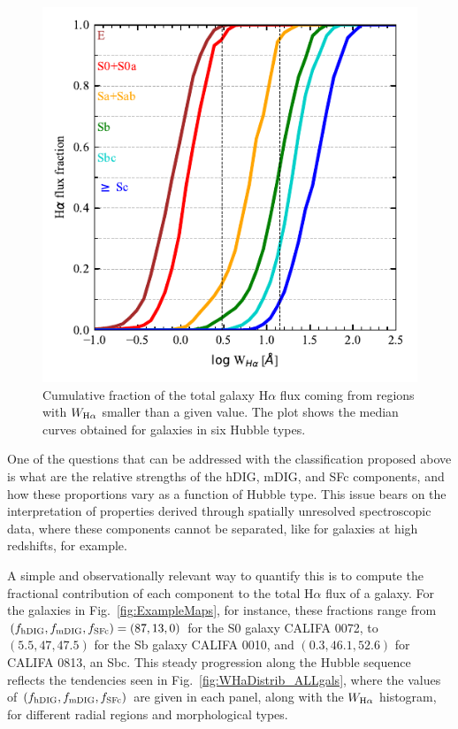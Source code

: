 \documentclass[a4paper, fleqn, usenatbib, useAMS]{mnras}
\newcommand{\Ha}{\ifmmode {\rm H}\alpha \else H$\alpha$\fi\xspace}
\begin{document}
\begin{figure}
 \includegraphics{figs/fig_cumul_fHaWHa_per_morftype.pdf}
 \caption{Cumulative fraction of the total galaxy \Ha flux coming from regions with $W_{\Ha}$ smaller than a given value. The plot shows the median curves obtained for galaxies in six Hubble types.}
 \label{fig:CurveOfGrowth}
\end{figure}

One of the questions that can be addressed with the classification proposed above is what are the relative strengths of the hDIG, mDIG, and SFc components, and how these proportions vary as a function of Hubble type. This issue bears on the interpretation of properties derived through spatially unresolved spectroscopic data, where these components cannot be separated, like for galaxies at high redshifts, for example.

A simple and observationally relevant  way to quantify this is to compute the fractional contribution of each component to the total \Ha flux of a galaxy. For the galaxies in Fig.\ \ref{fig:ExampleMaps}, for instance, these fractions range from $(f_{\rm hDIG} , f_{\rm mDIG} , f_{\rm SFc}) = (87,13,0)$ for the S0 galaxy CALIFA 0072, to $(5.5,47,47.5)$ for the Sb galaxy CALIFA 0010, and $(0.3,46.1,52.6)$ for CALIFA 0813, an Sbc. This steady progression along the Hubble sequence reflects the tendencies seen in Fig.\ \ref{fig:WHaDistrib_ALLgals}, where the values of $(f_{\rm hDIG} , f_{\rm mDIG} , f_{\rm SFc})$ are given in each panel, along with the $W_{\Ha}$ histogram, for different radial regions and morphological types.
\end{document}
